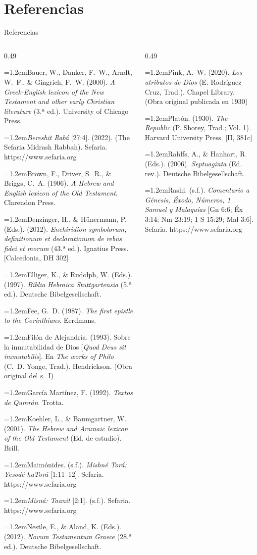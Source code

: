 \documentclass[hyperref={bookmarks=false},aspectratio=169]{beamer}
\newcommand{\refapa}[1]{\par{\RaggedRight\hangindent=1.2em\hangafter=1\noindent #1\par}\vspace{3pt}}
\begin{document}
\section{Referencias}

\begin{frame}{Referencias}
\fontsize{5.4}{6.4}\selectfont
\begin{columns}[t,onlytextwidth]
\begin{column}{0.49\textwidth}
\refapa{Bauer, W., Danker, F.~W., Arndt, W.~F., \& Gingrich, F.~W. (2000). \emph{A Greek-English lexicon of the New Testament and other early Christian literature} (3.ª ed.). University of Chicago Press.}
\refapa{\emph{Bereshit Rabá} [27:4]. (2022). (The Sefaria Midrash Rabbah). Sefaria. https://www.sefaria.org}
\refapa{Brown, F., Driver, S.~R., \& Briggs, C.~A. (1906). \emph{A Hebrew and English lexicon of the Old Testament}. Clarendon Press.}
\refapa{Denzinger, H., \& Hünermann, P. (Eds.). (2012). \emph{Enchiridion symbolorum, definitionum et declarationum de rebus fidei et morum} (43.ª ed.). Ignatius Press. [Calcedonia, DH 302]}
\refapa{Elliger, K., \& Rudolph, W. (Eds.). (1997). \emph{Biblia Hebraica Stuttgartensia} (5.ª ed.). Deutsche Bibelgesellschaft.}
\refapa{Fee, G.~D. (1987). \emph{The first epistle to the Corinthians}. Eerdmans.}
\refapa{Filón de Alejandría. (1993). Sobre la inmutabilidad de Dios [\emph{Quod Deus sit immutabilis}]. En \emph{The works of Philo} (C.~D. Yonge, Trad.). Hendrickson. (Obra original del s.~I)}
\refapa{García Martínez, F. (1992). \emph{Textos de Qumrán}. Trotta.}
\refapa{Koehler, L., \& Baumgartner, W. (2001). \emph{The Hebrew and Aramaic lexicon of the Old Testament} (Ed. de estudio). Brill.}
\refapa{Maimónides. (s.f.). \emph{Mishné Torá: Yesodé haTorá} [1:11--12]. Sefaria. https://www.sefaria.org}
\refapa{\emph{Misná: Taanit} [2:1]. (s.f.). Sefaria. https://www.sefaria.org}
\refapa{Nestle, E., \& Aland, K. (Eds.). (2012). \emph{Novum Testamentum Graece} (28.ª ed.). Deutsche Bibelgesellschaft.}
\end{column}
\begin{column}{0.49\textwidth}
\refapa{Pink, A.~W. (2020). \emph{Los atributos de Dios} (E. Rodríguez Cruz, Trad.). Chapel Library. (Obra original publicada en 1930)}
\refapa{Platón. (1930). \emph{The Republic} (P. Shorey, Trad.; Vol. 1). Harvard University Press. [II, 381c]}
\refapa{Rahlfs, A., \& Hanhart, R. (Eds.). (2006). \emph{Septuaginta} (Ed. rev.). Deutsche Bibelgesellschaft.}
\refapa{Rashi. (s.f.). \emph{Comentario a Génesis, Éxodo, Números, 1 Samuel y Malaquías} [Gn 6:6; Éx 3:14; Nm 23:19; 1 S 15:29; Mal 3:6]. Sefaria. https://www.sefaria.org}

\end{column}
\end{columns}
\end{frame}
\end{document}
